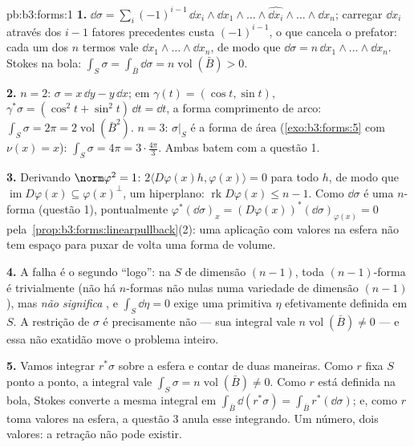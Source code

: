 \begin{solution}{pb:b3:forms:1}
\textbf{1.} $\dd\sigma = \sum_i(-1)^{i-1}\,\dd x_i\wedge\dd
x_1\wedge\dots\wedge\widehat{\dd x_i}\wedge\dots\wedge\dd
x_n$; carregar $\dd x_i$ através dos $i-1$ fatores precedentes
custa $(-1)^{i-1}$, o que cancela o prefator: cada um dos
$n$ termos vale $\dd x_1\wedge\dots\wedge\dd x_n$, de modo que
$\dd\sigma = n\,\dd x_1\wedge\dots\wedge\dd x_n$. Stokes na
bola: $\int_S\sigma = \int_{\bar B}\dd\sigma =
n\operatorname{vol}(\bar B) > 0$.

\textbf{2.} $n = 2$: $\sigma = x\,\dd y - y\,\dd x$; em
$\gamma(t) = (\cos t, \sin t)$, $\gamma^*\sigma = (\cos^2t +
\sin^2t)\,\dd t = \dd t$, a forma comprimento de arco:
$\int_S\sigma = 2\pi = 2\operatorname{vol}(\bar B^2)$.
$n = 3$: $\sigma\vert_S$ é a forma de área
(\cref{exo:b3:forms:5} com $\nu(x) = x$):
$\int_S\sigma = 4\pi = 3\cdot\tfrac{4\pi}3$. Ambas batem com
a questão 1.

\textbf{3.} Derivando $\norm\varphi^2 = 1$: $2\langle
D\varphi(x)h, \varphi(x)\rangle = 0$ para todo $h$, de modo que
$\operatorname{im}D\varphi(x) \subseteq \varphi(x)^\perp$, um
hiperplano: $\operatorname{rk}D\varphi(x) \leq n - 1$. Como
$\dd\sigma$ é uma $n$-forma (questão 1), pontualmente
$\varphi^*(\dd\sigma)_x =
(D\varphi(x))^*(\dd\sigma)_{\varphi(x)} = 0$ pela~\cref{prop:b3:forms:linearpullback}(2): uma aplicação com valores na
esfera não tem espaço para puxar de volta uma forma de volume.

\textbf{4.} A falha é o segundo ``logo'': na $S$ de dimensão
$(n-1)$, toda $(n-1)$-forma é trivialmente
 (não há $n$-formas não nulas numa variedade de dimensão
$(n-1)$), mas \emph{ não significa },
e $\int_S\dd\eta = 0$ exige uma primitiva $\eta$ efetivamente
definida em $S$. A restrição de $\sigma$ é precisamente não
 --- sua integral vale $n\operatorname{vol}(\bar B) \neq
0$ --- e essa não exatidão move o problema inteiro.

\textbf{5.} Vamos integrar $r^*\sigma$ sobre a esfera
e contar de duas maneiras. Como $r$ fixa $S$ ponto a ponto, a
integral vale $\int_S\sigma = n\operatorname{vol}(\bar B)
\neq 0$. Como $r$ está definida na bola, Stokes converte
a mesma integral em $\int_{\bar B}\dd(r^*\sigma) =
\int_{\bar B}r^*(\dd\sigma)$; e, como $r$ toma valores
na esfera, a questão 3 anula esse integrando. Um
número, dois valores: a retração não pode existir.


\end{solution}
